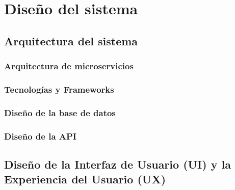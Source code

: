 \chapter{Diseño del sistema}\label{cap:disenio}

\section{Arquitectura del sistema}

\subsection{Arquitectura de microservicios}

\subsection{Tecnologías y Frameworks}

\subsection{Diseño de la base de datos}

\subsection{Diseño de la API}

\section{Diseño de la Interfaz de Usuario (UI) y la Experiencia del Usuario (UX)}

